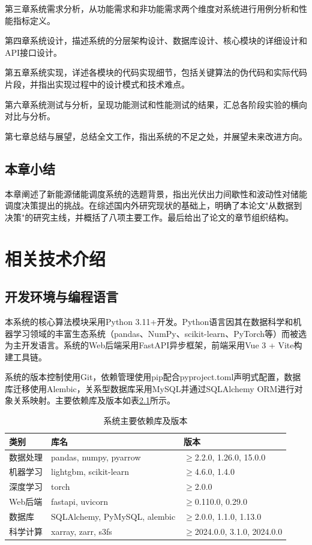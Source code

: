 \documentclass[12pt,a4paper]{ctexbook}
\begin{document}
第三章系统需求分析，从功能需求和非功能需求两个维度对系统进行用例分析和性能指标定义。

第四章系统设计，描述系统的分层架构设计、数据库设计、核心模块的详细设计和API接口设计。

第五章系统实现，详述各模块的代码实现细节，包括关键算法的伪代码和实际代码片段，并指出实现过程中的设计模式和技术难点。

第六章系统测试与分析，呈现功能测试和性能测试的结果，汇总各阶段实验的横向对比与分析。

第七章总结与展望，总结全文工作，指出系统的不足之处，并展望未来改进方向。

\section{本章小结}

本章阐述了新能源储能调度系统的选题背景，指出光伏出力间歇性和波动性对储能调度决策提出的挑战。在综述国内外研究现状的基础上，明确了本论文"从数据到决策"的研究主线，并概括了八项主要工作。最后给出了论文的章节组织结构。

\chapter{相关技术介绍}

\section{开发环境与编程语言}

本系统的核心算法模块采用Python 3.11+开发。Python语言因其在数据科学和机器学习领域的丰富生态系统（pandas、NumPy、scikit-learn、PyTorch等）而被选为主开发语言。系统的Web后端采用FastAPI异步框架，前端采用Vue 3 + Vite构建工具链。\cite{scikit-learn-2011,pytorch-2019,fastapi,vue3}

系统的版本控制使用Git，依赖管理使用pip配合pyproject.toml声明式配置，数据库迁移使用Alembic，关系型数据库采用MySQL并通过SQLAlchemy ORM进行对象关系映射。主要依赖库及版本如表\ref{tab:dependencies}所示。

\begin{table}[H]
\centering
\caption{系统主要依赖库及版本}
\label{tab:dependencies}
\begin{tabular}{@{}lll@{}}
\toprule
\textbf{类别} & \textbf{库名} & \textbf{版本} \\
\midrule
数据处理 & pandas, numpy, pyarrow & $\ge$2.2.0, 1.26.0, 15.0.0 \\
机器学习 & lightgbm, scikit-learn & $\ge$4.6.0, 1.4.0 \\
深度学习 & torch & $\ge$2.0.0 \\
Web后端 & fastapi, uvicorn & $\ge$0.110.0, 0.29.0 \\
数据库 & SQLAlchemy, PyMySQL, alembic & $\ge$2.0.0, 1.1.0, 1.13.0 \\
科学计算 & xarray, zarr, s3fs & $\ge$2024.0.0, 3.1.0, 2024.0.0 \\
\bottomrule
\end{tabular}
\end{table}
\end{document}
